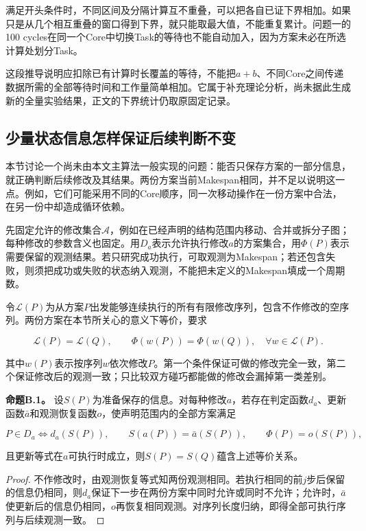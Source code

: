 \documentclass[anonymous,notoc]{gmcm2026}
\begin{document}
满足开头条件时，不同区间及分隔计算互不重叠，可以把各自已证下界相加。如果只是从几个相互重叠的窗口得到下界，就只能取最大值，不能重复累计。问题一的100 cycles在同一个Core中切换Task的等待也不能自动加入，因为方案未必在所选计算处划分Task。

这段推导说明应扣除已有计算时长覆盖的等待，不能把\(a+b\)、不同Core之间传递数据所需的全部等待时间和工作量简单相加。它属于补充理论分析，尚未据此生成新的全量实验结果，正文的下界统计仍取原固定记录。

\subsection{少量状态信息怎样保证后续判断不变}

本节讨论一个尚未由本文主算法一般实现的问题：能否只保存方案的一部分信息，就正确判断后续修改及其结果。两份方案当前Makespan相同，并不足以说明这一点。例如，它们可能采用不同的Core顺序，同一次移动操作在一份方案中合法，在另一份中却造成循环依赖。

先固定允许的修改集合\(\mathcal A\)，例如在已经声明的结构范围内移动、合并或拆分子图；每种修改的参数含义也固定。用\(D_a\)表示允许执行修改\(a\)的方案集合，用\(\Phi(P)\)表示需要保留的观测结果。若只研究成功执行，可取观测为Makespan；若还包含失败，则须把成功或失败的状态纳入观测，不能把未定义的Makespan填成一个周期数。

令\(\mathcal L(P)\)为从方案\(P\)出发能够连续执行的所有有限修改序列，包含不作修改的空序列。两份方案在本节所关心的意义下等价，要求

\[\mathcal L(P)=\mathcal L(Q),\qquad \Phi(w(P))=\Phi(w(Q)),\quad\forall w\in\mathcal L(P).\]

其中\(w(P)\)表示按序列\(w\)依次修改\(P\)。第一个条件保证可做的修改完全一致，第二个保证修改后的观测一致；只比较双方碰巧都能做的修改会漏掉第一类差别。

\textbf{命题B.1。} 设\(S(P)\)为准备保存的信息。对每种修改\(a\)，若存在判定函数\(d_a\)、更新函数\(\bar a\)和观测恢复函数\(o\)，使声明范围内的全部方案满足

\[P\in D_a\iff d_a(S(P)),\qquad S(a(P))=\bar a(S(P)),\qquad\Phi(P)=o(S(P)),\]

且更新等式在\(a\)可执行时成立，则\(S(P)=S(Q)\)蕴含上述等价关系。

\begin{proof} 不作修改时，由观测恢复等式知两份观测相同。若执行相同的前\(j\)步后保留的信息仍相同，则\(d_a\)保证下一步在两份方案中同时允许或同时不允许；允许时，\(\bar a\)使更新后的信息仍相同，\(o\)再恢复相同观测。对序列长度归纳，即得全部可执行序列与后续观测一致。\end{proof}
\end{document}

